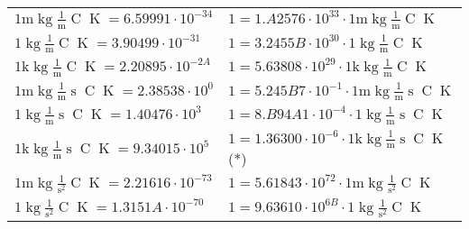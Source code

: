 \begin{center}
\begin{longtable}{l l}
{\color{gray}$1 \bm{\mathrm{ m}}\operatorname{kg}\frac1{\operatorname{m}}{}{\operatorname{C}}{\operatorname{K}} = 6.59991\cdot10^{-34} $}   & {\color{gray}$ 1 = 1.A2576\cdot10^{33} \cdot 1 \bm{\mathrm{ m}}\operatorname{kg}\frac1{\operatorname{m}}{}{\operatorname{C}}{\operatorname{K}}$}  \\
{\color{black}$1 \bm{\mathrm{ }}\operatorname{kg}\frac1{\operatorname{m}}{}{\operatorname{C}}{\operatorname{K}} = 3.90499\cdot10^{-31} $}   & {\color{black}$ 1 = 3.2455B\cdot10^{30} \cdot 1 \bm{\mathrm{ }}\operatorname{kg}\frac1{\operatorname{m}}{}{\operatorname{C}}{\operatorname{K}}$}  \\
{\color{gray}$1 \bm{\mathrm{ k}}\operatorname{kg}\frac1{\operatorname{m}}{}{\operatorname{C}}{\operatorname{K}} = 2.20895\cdot10^{-2A} $}   & {\color{gray}$ 1 = 5.63808\cdot10^{29} \cdot 1 \bm{\mathrm{ k}}\operatorname{kg}\frac1{\operatorname{m}}{}{\operatorname{C}}{\operatorname{K}}$}  \\
{\color{gray}$1 \bm{\mathrm{ m}}\operatorname{kg}\frac1{\operatorname{m}}{\operatorname{s}}{\operatorname{C}}{\operatorname{K}} = 2.38538\cdot10^{0} $}   & {\color{gray}$ 1 = 5.245B7\cdot10^{-1} \cdot 1 \bm{\mathrm{ m}}\operatorname{kg}\frac1{\operatorname{m}}{\operatorname{s}}{\operatorname{C}}{\operatorname{K}}$}  \\
{\color{black}$1 \bm{\mathrm{ }}\operatorname{kg}\frac1{\operatorname{m}}{\operatorname{s}}{\operatorname{C}}{\operatorname{K}} = 1.40476\cdot10^{3} $}   & {\color{black}$ 1 = 8.B94A1\cdot10^{-4} \cdot 1 \bm{\mathrm{ }}\operatorname{kg}\frac1{\operatorname{m}}{\operatorname{s}}{\operatorname{C}}{\operatorname{K}}$}  \\
{\color{gray}$1 \bm{\mathrm{ k}}\operatorname{kg}\frac1{\operatorname{m}}{\operatorname{s}}{\operatorname{C}}{\operatorname{K}} = 9.34015\cdot10^{5} $}   & {\color{gray}$ 1 = 1.36300\cdot10^{-6} \cdot 1 \bm{\mathrm{ k}}\operatorname{kg}\frac1{\operatorname{m}}{\operatorname{s}}{\operatorname{C}}{\operatorname{K}}$}\quad(*)\\
{\color{gray}$1 \bm{\mathrm{ m}}\operatorname{kg}{}\frac1{\operatorname{s}^2}{\operatorname{C}}{\operatorname{K}} = 2.21616\cdot10^{-73} $}   & {\color{gray}$ 1 = 5.61843\cdot10^{72} \cdot 1 \bm{\mathrm{ m}}\operatorname{kg}{}\frac1{\operatorname{s}^2}{\operatorname{C}}{\operatorname{K}}$}  \\
{\color{black}$1 \bm{\mathrm{ }}\operatorname{kg}{}\frac1{\operatorname{s}^2}{\operatorname{C}}{\operatorname{K}} = 1.3151A\cdot10^{-70} $}   & {\color{black}$ 1 = 9.63610\cdot10^{6B} \cdot 1 \bm{\mathrm{ }}\operatorname{kg}{}\frac1{\operatorname{s}^2}{\operatorname{C}}{\operatorname{K}}$}  \\

\end{longtable}
\end{center}
